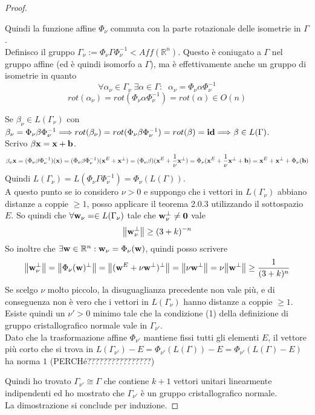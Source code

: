 \documentclass[12pt,a4paper]{book}
\begin{document}
\begin{proof}
\begin{itemize}
Quindi la funzione affine $\Phi_{\nu}$ commuta con la parte rotazionale delle isometrie in $\Gamma$. \\
Definisco il gruppo $\Gamma_{\nu} := \Phi_{\nu} \Gamma \Phi_{\nu}^{-1} < Aff(\mathbb{R}^n)$. Questo è coniugato a $\Gamma$ nel gruppo affine (ed è quindi isomorfo a $\Gamma$), ma è effettivamente anche un gruppo di isometrie in quanto 
\[ \forall \alpha_{\nu} \in \Gamma_{\nu} \; \exists \alpha \in \Gamma : \; \; \alpha_{\nu} =  \Phi_{\nu} \alpha \Phi_{\nu}^{-1}  \]
\[ rot( \alpha_{\nu}) = rot(\Phi_{\nu} \alpha \Phi_{\nu}^{-1}) = rot(\alpha) \in O(n)\]

Se $\beta_{\nu} \in L(\Gamma_{\nu}) $ con  $ \beta_{\nu} = \Phi_{\nu} \beta \Phi_{\nu}^{-1} \Longrightarrow rot(\beta_{\nu}) = rot(\Phi_{\nu} \beta \Phi_{\nu}^{-1}) = rot(\beta) = \vb{id}  \Longrightarrow \beta \in L(\Gamma)$. \\ Scrivo $\beta \vb{x} = \vb{x} + \vb{b}  $. 
\[\beta_{\nu} \vb{x} = (\Phi_{\nu} \beta \Phi_{\nu}^{-1})(\vb{x}) = (\Phi_{\nu} \beta \Phi_{\nu}^{-1})(\vb{x}^E + \vb{x}^{\perp}) =  
 (\Phi_{\nu} \beta)(\vb{x}^E + \frac{1}{\nu}\vb{x}^{\perp}) =  \Phi_{\nu}(\vb{x}^E + \frac{1}{\nu}\vb{x}^{\perp} + \vb{b}) = \vb{x}^E + \vb{x}^{\perp} + \Phi_{\nu}(\vb{b}) \] 
Quindi  $L(\Gamma_{\nu})  = L(\Phi_{\nu} \Gamma \Phi_{\nu}^{-1}) = \Phi_{\nu}(L(\Gamma))$. \\
A questo punto se io considero $\nu >0 $ e suppongo che i vettori in  $L(\Gamma_{\nu})$ abbiano distanze a coppie $\geq 1$, posso applicare il teorema 2.0.3 utilizzando il sottospazio $E$. So quindi che $\forall \vb{w}_{\nu} = \in L(\Gamma_{\nu})$ tale che $\vb{w}_{\nu}^{\perp} \neq \vb{0}$ vale 
\[ \norm{\vb{w}_{\nu}^{\perp}} \geq (3 + k)^{-n}\]
So inoltre che $\exists \vb{w} \in \mathbb{R}^n : \vb{w}_{\nu} = \Phi_{\nu}(\vb{w})$, quindi posso scrivere
\[ \norm{\vb{w}_{\nu}^{\perp}} = \norm{\Phi_{\nu}(\vb{w})^{\perp}} = \norm{ (\vb{w}^{E} + \nu \vb{w}^{\perp})^{\perp}} = \norm{\nu \vb{w}^{\perp}} = \nu \norm{\vb{w}^{\perp}}\geq \frac{1}{(3 + k)^{n}} \]
Se scelgo $\nu$ molto piccolo, la disuguaglianza precedente non vale più, e di conseguenza non è vero che i vettori in  $L(\Gamma_{\nu})$ hanno distanze a coppie $\geq 1$. Esiste quindi un $\nu' > 0 $ minimo tale che la condizione (1) della definizione di gruppo cristallografico normale vale in $\Gamma_{\nu '}$.  \\
Dato che la trasformazione affine $\Phi_{\nu '}$ mantiene fissi tutti gli elementi $E$, il vettore più corto che si trova in $L(\Gamma_{\nu'}) - E  = \Phi_{\nu'}(L(\Gamma)) - E = \Phi_{\nu'}(L(\Gamma) - E)$ ha norma $1$ (PERCHé????????????????) \\
\end{itemize}
Quindi ho trovato  $\Gamma_{\nu'} \cong \Gamma$ che contiene $k+1$ vettori unitari linearmente indipendenti ed ho mostrato che $\Gamma_{\nu'}$ è un gruppo cristallografico normale.  \\
La dimostrazione si conclude per induzione. 
\end{proof}
\end{document}
